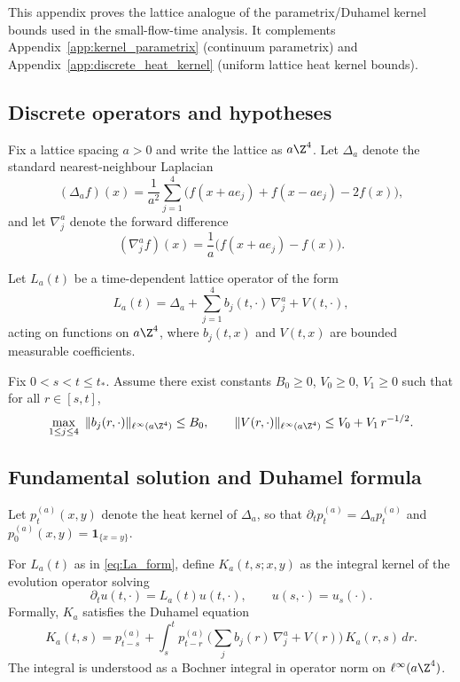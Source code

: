 \label{app:discrete_parametrix}

This appendix proves the lattice analogue of the parametrix/Duhamel kernel bounds used in the small-flow-time analysis.
It complements Appendix~\ref{app:kernel_parametrix} (continuum parametrix) and Appendix~\ref{app:discrete_heat_kernel} (uniform lattice heat kernel bounds).

\subsection*{Discrete operators and hypotheses}

Fix a lattice spacing $a>0$ and write the lattice as $a\Z^4$.
Let $\Delta_a$ denote the standard nearest-neighbour Laplacian
\[
(\Delta_a f)(x)=\frac{1}{a^2}\sum_{j=1}^{4}\big(f(x+ae_j)+f(x-ae_j)-2f(x)\big),
\]
and let $\nabla^a_j$ denote the forward difference
\[
(\nabla^a_j f)(x)=\frac{1}{a}\big(f(x+ae_j)-f(x)\big).
\]

Let $L_a(t)$ be a time-dependent lattice operator of the form
\begin{equation}
\label{eq:La_form}
L_a(t)=\Delta_a+\sum_{j=1}^{4} b_j(t,\cdot)\,\nabla^a_j + V(t,\cdot),
\end{equation}
acting on functions on $a\Z^4$, where $b_j(t,x)$ and $V(t,x)$ are bounded measurable coefficients.

\begin{proposition}
\label{ass:lattice_coeff_bounds}
Fix $0<s<t\le t_\ast$.
Assume there exist constants $B_0\ge 0$, $V_0\ge 0$, $V_1\ge 0$ such that for all $r\in[s,t]$,
\[
\max_{1\le j\le 4}\ \|b_j(r,\cdot)\|_{\ell^\infty(a\Z^4)}\le B_0,
\qquad
\|V(r,\cdot)\|_{\ell^\infty(a\Z^4)}\le V_0+V_1\,r^{-1/2}.
\]
\end{proposition}

\subsection*{Fundamental solution and Duhamel formula}

Let $p^{(a)}_{t}(x,y)$ denote the heat kernel of $\Delta_a$, so that
$\partial_t p^{(a)}_{t}=\Delta_a p^{(a)}_{t}$ and $p^{(a)}_{0}(x,y)=\mathbf 1_{\{x=y\}}$.

For $L_a(t)$ as in \eqref{eq:La_form}, define $K_a(t,s;x,y)$ as the integral kernel of the evolution operator
solving
\[
\partial_t u(t,\cdot)=L_a(t)u(t,\cdot),\qquad u(s,\cdot)=u_s(\cdot).
\]
Formally, $K_a$ satisfies the Duhamel equation
\begin{equation}
\label{eq:duhamel_discrete}
K_a(t,s)=p^{(a)}_{t-s}+\int_s^t p^{(a)}_{t-r}\,\Big(\sum_{j} b_j(r)\,\nabla^a_j +V(r)\Big)\,K_a(r,s)\,dr.
\end{equation}
The integral is understood as a Bochner integral in operator norm on $\ell^\infty(a\Z^4)$.

